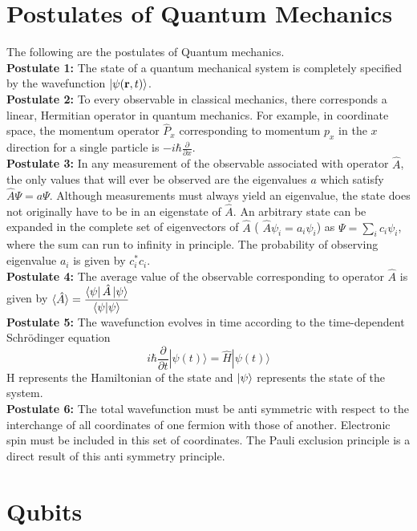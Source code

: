 \documentclass{report}
\begin{document}
\section{Postulates of Quantum Mechanics}
The following are the postulates of Quantum mechanics.\\
\textbf{Postulate 1:} The state of a quantum mechanical system is completely specified by the wavefunction $\ket{\psi({\bf r}, t)}$.
\\
\textbf{Postulate 2:} To every observable in classical mechanics, there corresponds a linear, Hermitian operator in quantum mechanics. For example, in coordinate space, the momentum operator ${\hat P}_x$ corresponding to momentum $p_x$ in the $x$ direction for a single particle is $-i \hbar \frac{\partial}{\partial x}$.\\
\textbf{Postulate 3:} In any measurement of the observable associated with operator ${\hat
A}$, the only values that will ever be observed are the eigenvalues $a$ which satisfy ${\hat A} \Psi = a \Psi$. Although measurements must always yield an eigenvalue, the state does not originally have to be in an eigenstate of ${\hat
A}$. An arbitrary state can be expanded in the complete set of eigenvectors of ${\hat A}$ ( ${\hat A} \psi_i = a_i \psi_i$) as $\Psi = \sum_i c_i \psi_i$, where the sum can run to infinity in principle. The probability of observing eigenvalue $a_i$ is given by $c_i^* c_i$.\\
\textbf{Postulate 4:} The average value of the observable corresponding to operator ${\hat{A}}$ is given by 
$\langle\hat{A}\rangle = \dfrac{\bra{\psi}\hat A\ket{\psi}}{\langle\psi|\psi\rangle}$ \\
\textbf{Postulate 5:} The wavefunction evolves in time according to the time-dependent Schrödinger equation
\begin{equation*}
\displaystyle i\hbar {\frac {\partial }{\partial t}}|\psi (t)\rangle ={\hat {H}}|\psi (t)\rangle\end{equation*}
H represents the Hamiltonian of the state and $\ket{\psi}$ represents the state of the system.\\
\textbf{Postulate 6:} The total wavefunction must be anti symmetric with respect to the interchange of all coordinates of one fermion with those of another. Electronic spin must be included in this set of coordinates. The Pauli exclusion principle is a direct result of this anti symmetry principle.
\\


\section{Qubits}
\end{document}
